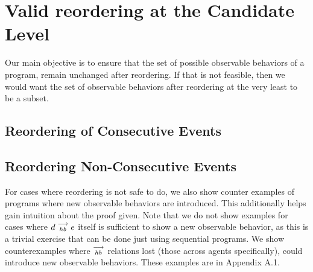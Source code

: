 
\section{Valid reordering at the Candidate Level}
    
    Our main objective is to ensure that the set of possible observable behaviors of a program, remain unchanged after reordering.
    If that is not feasible, then we would want the set of observable behaviors after reordering at the very least to be a subset.

    \subsection{Reordering of Consecutive Events}
        
        

    \subsection{Reordering Non-Consecutive Events}
        

    For cases where reordering is not safe to do, we also show counter examples of programs where new observable behaviors are introduced.
    This additionally helps gain intuition about the proof given. 
    Note that we do not show examples for cases where $d\stackrel{\longrightarrow}{_{hb}}e$ itself is sufficient to show a new observable behavior, as this is a trivial exercise that can be done just using sequential programs.
    We show counterexamples where $\stackrel{\longrightarrow}{_{hb}}$ relations lost (those across agents specifically), could introduce new observable behaviors. 
    These examples are in Appendix A.1.
